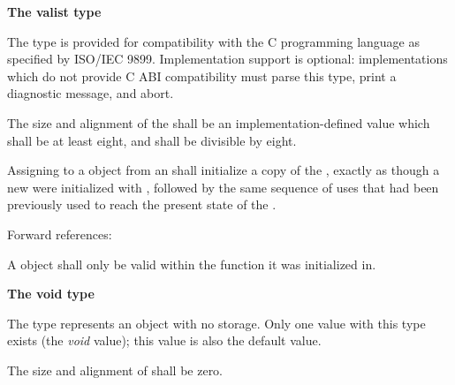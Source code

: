 \textbf{The valist type}

\specsubsubitem
The  type is provided for compatibility with the C programming
language as specified by ISO/IEC 9899. Implementation support is optional:
implementations which do not provide C ABI compatibility must parse this type,
print a diagnostic message, and abort.

\specsubsubitem
The size and alignment of the  shall be an
implementation-defined value which shall be at least eight, and shall be
divisible by eight.

\specsubsubitem
Assigning to a  object from an 
shall initialize a copy of the , exactly as though
a new  were initialized with , followed by
the same sequence of  uses that had been previously used to
reach the present state of the .


Forward references: 

\specsubsubitem
A  object shall only be valid within the function it was
initialized in.

\textbf{The void type}

\specsubsubitem
The  type represents an object with no storage. Only one value
with this type exists (the \textit{void} value); this value is also the default
value.

\specsubsubitem
The size and alignment of  shall be zero.


